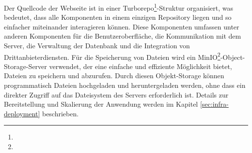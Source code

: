 \documentclass{subfiles}
\begin{document}
Der Quellcode der Webseite ist in einer Turborepo\footnote{}-Struktur organisiert, was bedeutet, dass alle Komponenten in einem einzigen Repository liegen
und so einfacher miteinander interagieren können.
Diese Komponenten umfassen unter anderen Komponenten für die Benutzeroberfläche, die Kommunikation mit dem Server, die Verwaltung der Datenbank und die Integration von Drittanbieterdiensten.
Für die Speicherung von Dateien wird ein MinIO\footnote{}-Object-Storage-Server verwendet, der eine einfache und effiziente Möglichkeit bietet, Dateien zu speichern und abzurufen.
Durch diesen Objekt-Storage können programmatisch Dateien hochgeladen und heruntergeladen werden, ohne dass ein direkter Zugriff auf das Dateisystem des Servers erforderlich ist.
Details zur Bereitstellung und Skalierung der Anwendung werden im Kapitel \ref{sec:infra-deployment} beschrieben.
\end{document}
